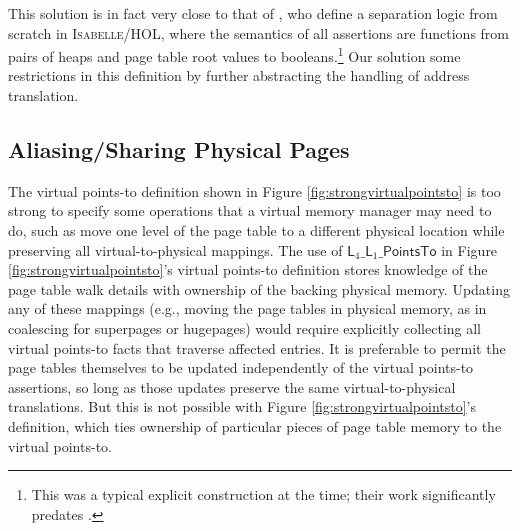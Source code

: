 This solution is in fact very close to that of \citet{kolanski08vstte}, who define a separation logic from scratch in \textsc{Isabelle/HOL},
where the semantics of all assertions are functions from pairs of heaps and page table root values to booleans.\footnote{
  This was a typical explicit construction at the time; their work significantly predates \iris.
}
Our solution  some restrictions in this definition by further abstracting the handling of address translation.

\subsection{Aliasing/Sharing Physical Pages}
  \label{sec:sharingpages}  
  The virtual points-to definition shown in Figure \ref{fig:strongvirtualpointsto} 
  is too strong to specify some operations that a virtual memory manager may need to do, such as move one level of the page table to a different physical location while preserving all virtual-to-physical mappings. %
  The use of $\textsf{L}_{4}\_\textsf{L}_{1}\_\textsf{PointsTo}$ in Figure \ref{fig:strongvirtualpointsto}'s
  virtual points-to definition stores knowledge of the page table walk details with ownership of the backing physical memory.
  Updating any of these mappings (e.g., moving the page tables in physical memory, as in coalescing for superpages or hugepages)
  would require explicitly collecting all virtual points-to facts that traverse affected entries.
  It is preferable to permit the page tables themselves to be updated independently of the virtual points-to assertions,
  so long as those updates preserve the same virtual-to-physical translations.
  But this is not possible with Figure \ref{fig:strongvirtualpointsto}'s definition, which ties ownership of particular pieces of page table memory to the virtual points-to.


  \newcommand{\ghostmaptoken}[3]{\ensuremath{#2\hookrightarrow^{#1}#3}}
  \newcommand{\fracghostmaptoken}[4]{\ensuremath{#2\hookrightarrow^{#1}_{#4}#3}}

